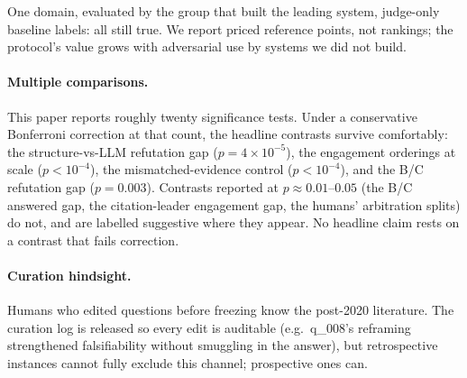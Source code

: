 One domain, evaluated by the group that built the leading system,
judge-only baseline labels: all still true. We report priced reference
points, not rankings; the protocol's value grows with adversarial use
by systems we did not build.

\paragraph{Multiple comparisons.} This paper reports roughly twenty
significance tests. Under a conservative Bonferroni correction at that
count, the headline contrasts survive comfortably: the
structure-vs-LLM refutation gap ($p=4\times10^{-5}$), the engagement
orderings at scale ($p<10^{-4}$), the mismatched-evidence control
($p<10^{-4}$), and the B/C refutation gap ($p=0.003$). Contrasts
reported at $p\approx0.01$--$0.05$ (the B/C answered gap, the
citation-leader engagement gap, the humans' arbitration splits)
do not, and are labelled suggestive where they appear. No headline
claim rests on a contrast that fails correction.

\paragraph{Curation hindsight.} Humans who edited questions before
freezing know the post-2020 literature. The curation log is released so
every edit is auditable (e.g.\ q\_008's reframing strengthened
falsifiability without smuggling in the answer), but retrospective
instances cannot fully exclude this channel; prospective ones can.
